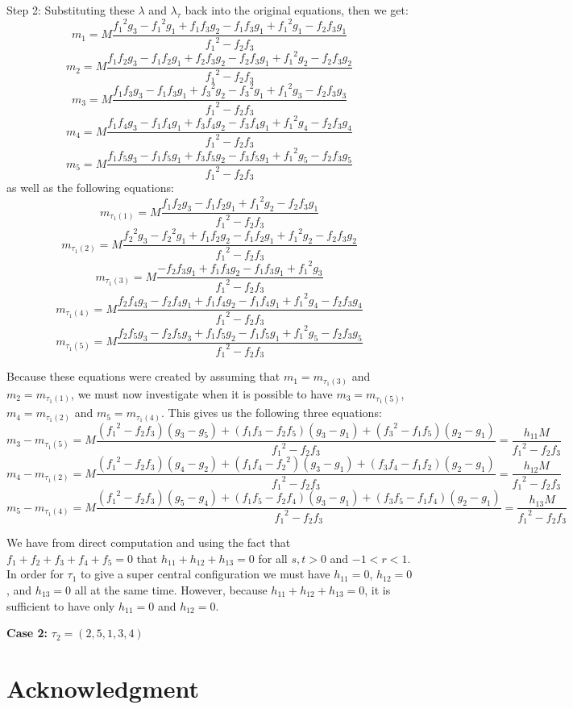 \documentclass[11pt,leqno]{article}
\theoremstyle{definition}
\theoremstyle{remark}
\numberwithin{equation}{section}
\begin{document}
Step 2: Substituting these $\lambda$ and $\lambda_\tau$ back into the original equations, then we get:
$$m_1=M\frac{{f_1}^2g_3-{f_1}^2g_1+f_1f_3g_2-f_1f_3g_1+{f_1}^2g_1-f_2f_3g_1}{{f_1}^2-f_2f_3}$$
$$m_2=M\frac{f_1f_2g_3-f_1f_2g_1+f_2f_3g_2-f_2f_3g_1+{f_1}^2g_2-f_2f_3g_2}{{f_1}^2-f_2f_3}$$
$$m_3=M\frac{f_1f_3g_3-f_1f_3g_1+{f_3}^2g_2-{f_3}^2g_1+{f_1}^2g_3-f_2f_3g_3}{{f_1}^2-f_2f_3}$$
$$m_4=M\frac{f_1f_4g_3-f_1f_4g_1+f_3f_4g_2-f_3f_4g_1+{f_1}^2g_4-f_2f_3g_4}{{f_1}^2-f_2f_3}$$
$$m_5=M\frac{f_1f_5g_3-f_1f_5g_1+f_3f_5g_2-f_3f_5g_1+{f_1}^2g_5-f_2f_3g_5}{{f_1}^2-f_2f_3}$$
as well as the following equations:
$$m_{\tau_1(1)}=M\frac{f_1f_2g_3-f_1f_2g_1+{f_1}^2g_2-f_2f_3g_1}{{f_1}^2-f_2f_3}$$
$$m_{\tau_1(2)}=M\frac{{f_2}^2g_3-{f_2}^2g_1+f_1f_2g_2-f_1f_2g_1+{f_1}^2g_2-f_2f_3g_2}{{f_1}^2-f_2f_3}$$
$$m_{\tau_1(3)}=M\frac{-f_2f_3g_1+f_1f_3g_2-f_1f_3g_1+{f_1}^2g_3}{{f_1}^2-f_2f_3}$$
$$m_{\tau_1(4)}=M\frac{f_2f_4g_3-f_2f_4g_1+f_1f_4g_2-f_1f_4g_1+{f_1}^2g_4-f_2f_3g_4}{{f_1}^2-f_2f_3}$$
$$m_{\tau_1(5)}=M\frac{f_2f_5g_3-f_2f_5g_3+f_1f_5g_2-f_1f_5g_1+{f_1}^2g_5-f_2f_3g_5}{{f_1}^2-f_2f_3}$$

Because these equations were created by assuming that $m_1=m_{\tau_1(3)}$ and $m_2=m_{\tau_1(1)}$, we must now investigate when it is possible to have $m_3=m_{\tau_1(5)}$, $m_4=m_{\tau_1(2)}$ and $m_5=m_{\tau_1(4)}$. This gives us the following three equations:
$$m_3-m_{\tau_1(5)}=M\frac{({f_1}^2-f_2f_3)(g_3-g_5)+(f_1f_3-f_2f_5)(g_3-g_1)+({f_3}^2-f_1f_5)(g_2-g_1)}{{f_1}^2-f_2f_3}=\frac{h_{11}M}{{f_1}^2-f_2f_3}$$
$$m_4-m_{\tau_1(2)}=M\frac{({f_1}^2-f_2f_3)(g_4-g_2)+(f_1f_4-{f_2}^2)(g_3-g_1)+(f_3f_4-f_1f_2)(g_2-g_1)}{{f_1}^2-f_2f_3}=\frac{h_{12}M}{{f_1}^2-f_2f_3}$$
$$m_5-m_{\tau_1(4)}=M\frac{({f_1}^2-f_2f_3)(g_5-g_4)+(f_1f_5-f_2f_4)(g_3-g_1)+(f_3f_5-f_1f_4)(g_2-g_1)}{{f_1}^2-f_2f_3}=\frac{h_{13}M}{{f_1}^2-f_2f_3}$$

We have from direct computation and using the fact that $f_1+f_2+f_3+f_4+f_5=0$ that $h_{11}+h_{12}+h_{13}=0$ for all $s,t > 0$ and $-1<r<1$. In order for $\tau_1$ to give a super central configuration we must have $h_{11}=0$, $h_{12}=0$, and $h_{13}=0$ all at the same time. However, because $h_{11}+h_{12}+h_{13}=0$, it is sufficient to have only $h_{11}=0$ and $h_{12}=0$.

\textbf{Case 2:} $\tau_2=(2,5,1,3,4)$


\section*{Acknowledgment}
\end{document}
